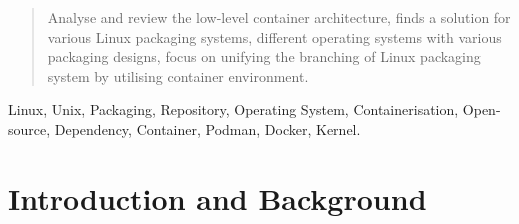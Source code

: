 \documentclass[journal,onecolumn]{IEEEtran}
\begin{document}







\maketitle

\begin{abstract}
Analyse and review the low-level container architecture, finds a solution for various Linux packaging systems, different operating systems with various packaging designs, focus on unifying the branching of Linux packaging system by utilising container environment.

\end{abstract}

\begin{IEEEkeywords}
Linux, Unix, Packaging, Repository, Operating System, Containerisation, Open-source, Dependency, Container, Podman, Docker, Kernel.
\end{IEEEkeywords}






%
\IEEEpeerreviewmaketitle



\section{Introduction and Background}
% 
% 
% 
% 
\end{document}
